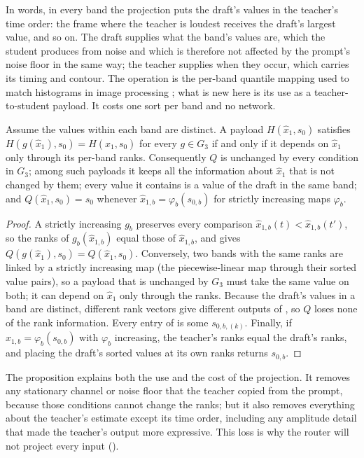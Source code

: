 In words, in every band the projection puts the draft's values in the teacher's time order: the frame where the teacher is loudest receives the draft's largest value, and so on. The draft supplies what the band's values are, which the student produces from noise and which is therefore not affected by the prompt's noise floor in the same way; the teacher supplies when they occur, which carries its timing and contour. The operation is the per-band quantile mapping used to match histograms in image processing ; what is new here is its use as a teacher-to-student payload. It costs one sort per band and no network.

\begin{proposition}\label{prop:invariance}
Assume the values within each band are distinct. A payload $H(\hat x_1,s_0)$ satisfies $H(g(\hat x_1),s_0)=H(\hat x_1,s_0)$ for every $g\in G_3$ if and only if it depends on $\hat x_1$ only through its per-band ranks. Consequently $Q$ is unchanged by every condition in $G_3$; among such payloads it keeps all the information about $\hat x_1$ that is not changed by them; every value it contains is a value of the draft in the same band; and $Q(\hat x_1,s_0)=s_0$ whenever $\hat x_{1,b}=\varphi_b(s_{0,b})$ for strictly increasing maps $\varphi_b$.
\end{proposition}
\begin{proof}
A strictly increasing $g_b$ preserves every comparison $\hat x_{1,b}(t)<\hat x_{1,b}(t')$, so the ranks of $g_b(\hat x_{1,b})$ equal those of $\hat x_{1,b}$, and  gives $Q(g(\hat x_1),s_0)=Q(\hat x_1,s_0)$. Conversely, two bands with the same ranks are linked by a strictly increasing map (the piecewise-linear map through their sorted value pairs), so a payload that is unchanged by $G_3$ must take the same value on both; it can depend on $\hat x_1$ only through the ranks. Because the draft's values in a band are distinct, different rank vectors give different outputs of , so $Q$ loses none of the rank information. Every entry of  is some $s_{0,b,(k)}$. Finally, if $\hat x_{1,b}=\varphi_b(s_{0,b})$ with $\varphi_b$ increasing, the teacher's ranks equal the draft's ranks, and placing the draft's sorted values at its own ranks returns $s_{0,b}$.
\end{proof}

The proposition explains both the use and the cost of the projection. It removes any stationary channel or noise floor that the teacher copied from the prompt, because those conditions cannot change the ranks; but it also removes everything about the teacher's estimate except its time order, including any amplitude detail that made the teacher's output more expressive. This loss is why the router will not project every input ().

